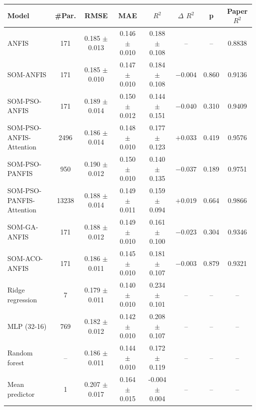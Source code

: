 \begin{tabular}{lccccccc}
\hline
Model & \#Par. & RMSE & MAE & $R^2$ & $\Delta$ $R^2$ & p & Paper $R^2$ \\
\hline
ANFIS & 171 & 0.185 $\pm$ 0.013 & 0.146 $\pm$ 0.010 & 0.188 $\pm$ 0.108 & -- & -- & 0.8838 \\
SOM-ANFIS & 171 & 0.185 $\pm$ 0.010 & 0.147 $\pm$ 0.010 & 0.184 $\pm$ 0.108 & $-0.004$ & 0.860 & 0.9136 \\
SOM-PSO-ANFIS & 171 & 0.189 $\pm$ 0.014 & 0.150 $\pm$ 0.012 & 0.144 $\pm$ 0.151 & $-0.040$ & 0.310 & 0.9409 \\
SOM-PSO-ANFIS-Attention & 2496 & 0.186 $\pm$ 0.014 & 0.148 $\pm$ 0.010 & 0.177 $\pm$ 0.123 & $+0.033$ & 0.419 & 0.9576 \\
SOM-PSO-PANFIS & 950 & 0.190 $\pm$ 0.012 & 0.150 $\pm$ 0.010 & 0.140 $\pm$ 0.135 & $-0.037$ & 0.189 & 0.9751 \\
SOM-PSO-PANFIS-Attention & 13238 & 0.188 $\pm$ 0.014 & 0.149 $\pm$ 0.011 & 0.159 $\pm$ 0.094 & $+0.019$ & 0.664 & 0.9866 \\
\hline
SOM-GA-ANFIS & 171 & 0.188 $\pm$ 0.012 & 0.149 $\pm$ 0.010 & 0.161 $\pm$ 0.100 & $-0.023$ & 0.304 & 0.9346 \\
SOM-ACO-ANFIS & 171 & 0.186 $\pm$ 0.011 & 0.145 $\pm$ 0.010 & 0.181 $\pm$ 0.107 & $-0.003$ & 0.879 & 0.9321 \\
\hline
Ridge regression & 7 & 0.179 $\pm$ 0.011 & 0.140 $\pm$ 0.010 & 0.234 $\pm$ 0.101 & -- & -- & -- \\
MLP (32-16) & 769 & 0.182 $\pm$ 0.012 & 0.142 $\pm$ 0.010 & 0.208 $\pm$ 0.107 & -- & -- & -- \\
Random forest & -- & 0.186 $\pm$ 0.011 & 0.144 $\pm$ 0.010 & 0.172 $\pm$ 0.119 & -- & -- & -- \\
Mean predictor & 1 & 0.207 $\pm$ 0.017 & 0.164 $\pm$ 0.015 & -0.004 $\pm$ 0.004 & -- & -- & -- \\
\hline
\end{tabular}
